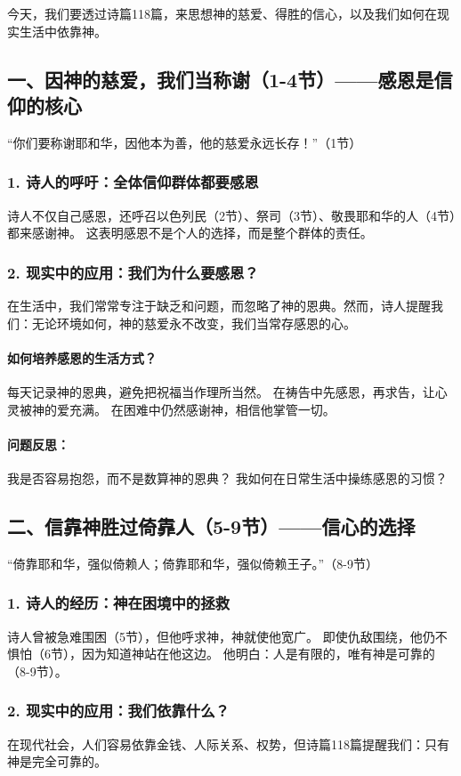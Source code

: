 \documentclass[a4paper, 12pt]{article}
\begin{document}
今天，我们要透过诗篇118篇，来思想神的慈爱、得胜的信心，以及我们如何在现实生活中依靠神。

\subsection*{一、因神的慈爱，我们当称谢（1-4节）——感恩是信仰的核心}
“你们要称谢耶和华，因他本为善，他的慈爱永远长存！”（1节）

\subsubsection*{1. 诗人的呼吁：全体信仰群体都要感恩}
诗人不仅自己感恩，还呼召以色列民（2节）、祭司（3节）、敬畏耶和华的人（4节）都来感谢神。
这表明感恩不是个人的选择，而是整个群体的责任。
\subsubsection*{2. 现实中的应用：我们为什么要感恩？}
在生活中，我们常常专注于缺乏和问题，而忽略了神的恩典。然而，诗人提醒我们：无论环境如何，神的慈爱永不改变，我们当常存感恩的心。

\paragraph*{如何培养感恩的生活方式？}

每天记录神的恩典，避免把祝福当作理所当然。
在祷告中先感恩，再求告，让心灵被神的爱充满。
在困难中仍然感谢神，相信他掌管一切。
\paragraph*{问题反思：}

我是否容易抱怨，而不是数算神的恩典？
我如何在日常生活中操练感恩的习惯？
\subsection*{二、信靠神胜过倚靠人（5-9节）——信心的选择}
“倚靠耶和华，强似倚赖人；倚靠耶和华，强似倚赖王子。”（8-9节）

\subsubsection*{1. 诗人的经历：神在困境中的拯救}
诗人曾被急难围困（5节），但他呼求神，神就使他宽广。
即使仇敌围绕，他仍不惧怕（6节），因为知道神站在他这边。
他明白：人是有限的，唯有神是可靠的（8-9节）。
\subsubsection*{2. 现实中的应用：我们依靠什么？}
在现代社会，人们容易依靠金钱、人际关系、权势，但诗篇118篇提醒我们：只有神是完全可靠的。
\end{document}

